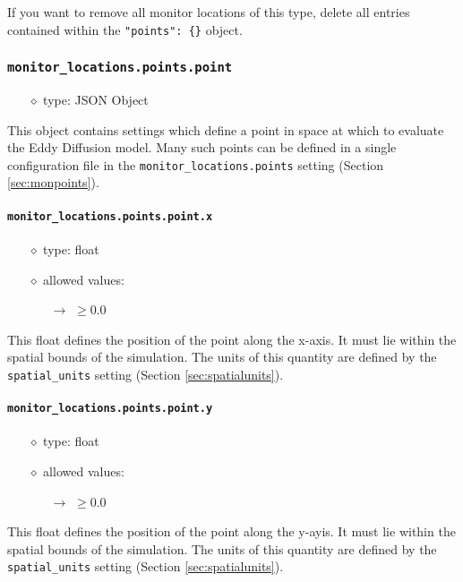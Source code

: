 \documentclass[]{article}
\def\code#1{\texttt{#1}}
\begin{document}
\noindent If you want to remove all monitor locations of this type, delete all
entries contained within the \code{"points": \{\}} object.

\subsubsection{\code{monitor\_locations.points.point}}
\begin{itemize}
    \item[$\diamond$] type: JSON Object 
\end{itemize}
This object contains settings which define a point in space at which to evaluate
the Eddy Diffusion model. Many such points can be defined in a
single configuration file in the \code{monitor\_locations.points} setting (Section
\ref{sec:monpoints}).

\paragraph{\code{monitor\_locations.points.point.x}}
\begin{itemize}
    \item[$\diamond$] type: float 
    \item[$\diamond$] allowed values:
    \begin{itemize}
        \item[$\rightarrow$] $\geq0.0$
    \end{itemize}
\end{itemize}
This float defines the position of the point along the x-axis. It must lie
within the spatial bounds of the simulation. The units of this quantity are
defined by the \code{spatial\_units} setting (Section \ref{sec:spatialunits}).

\paragraph{\code{monitor\_locations.points.point.y}}
\begin{itemize}
    \item[$\diamond$] type: float 
    \item[$\diamond$] allowed values:
    \begin{itemize}
        \item[$\rightarrow$] $\geq0.0$
    \end{itemize}
\end{itemize}
This float defines the position of the point along the y-ayis. It must lie
within the spatial bounds of the simulation. The units of this quantity are
defined by the \code{spatial\_units} setting (Section \ref{sec:spatialunits}).
\end{document}
